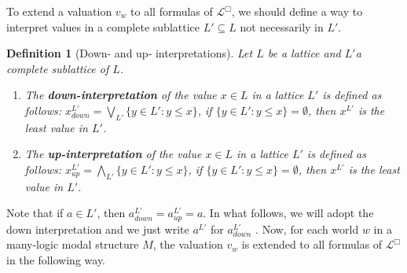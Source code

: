 \documentclass{amsart}
\newtheorem{definition}{Definition}[section]
\newcommand{\Lg}{\mathcal{L}}
\begin{document}
To extend a valuation $v_w$  to all formulas of $\Lg^\Box$, we should define a way to interpret values in a complete sublattice $L' \subseteq L$ not necessarily in $L'$.

\begin{definition}[Down- and up- interpretations] \label{def.down.int} 
	Let $L$ be a lattice and $L'$a complete sublattice of $L$. 

    \begin{enumerate}
        \item The {\bf down-interpretation} of the value $x \in L$ in a lattice $L'$ is defined as follows: $x_{down}^{L'} = \bigvee_{L'} \{y \in L' :  y \leqslant x \} $, if $\{y \in L' :  y \leqslant x \} = \emptyset$, then $x^{L'}$ is the least value in $L'$. 
        \item The {\bf up-interpretation} of the value $x \in L$ in a lattice $L'$ is defined as follows: $ x_{up}^{L'} = \bigwedge_{L'} \{y \in L' :  y \leqslant x \} $, if $\{y \in L' :  y \leqslant x \} = \emptyset$, then $x^{L'}$ is the least value in $L'$. 
    \end{enumerate}
\end{definition}


Note that if $a\in L'$, then $ a_{down}^{L'}=a_{up}^{L'}=a$. In what follows, we will adopt the down interpretation and we just write $ a^{L'}$ for $a_{down}^{L'}$ .
Now, for each world $w$ in a many-logic modal structure $M$, 
the valuation $v_w$ is extended to all formulas of $\Lg^\Box$ in the following way. 
\end{document}
